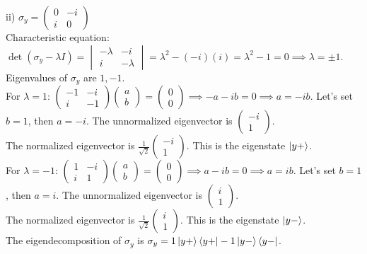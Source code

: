 \documentclass{article}
\newcommand{\0}{{$|0\rangle$}}
\newcommand{\1}{{$|1\rangle$}}
\begin{document}
ii) $\sigma_y = \begin{pmatrix} 0 & -i \\ i & 0 \end{pmatrix}$ \\
Characteristic equation: $\det(\sigma_y - \lambda I) = \begin{vmatrix} -\lambda & -i \\ i & -\lambda \end{vmatrix} = \lambda^2 - (-i)(i) = \lambda^2 - 1 = 0 \implies \lambda = \pm 1$. \\
Eigenvalues of $\sigma_y$ are $1, -1$. \\
For $\lambda = 1$: $\begin{pmatrix} -1 & -i \\ i & -1 \end{pmatrix} \begin{pmatrix} a \\ b \end{pmatrix} = \begin{pmatrix} 0 \\ 0 \end{pmatrix} \implies -a-ib=0 \implies a=-ib$. Let's set $b=1$, then $a=-i$. The unnormalized eigenvector is $\begin{pmatrix} -i \\ 1 \end{pmatrix}$. \\
The normalized eigenvector is $\frac{1}{\sqrt{2}}\begin{pmatrix} -i \\ 1 \end{pmatrix}$. This is the eigenstate $\ket{y+}$. \\
For $\lambda = -1$: $\begin{pmatrix} 1 & -i \\ i & 1 \end{pmatrix} \begin{pmatrix} a \\ b \end{pmatrix} = \begin{pmatrix} 0 \\ 0 \end{pmatrix} \implies a-ib=0 \implies a=ib$. Let's set $b=1$, then $a=i$. The unnormalized eigenvector is $\begin{pmatrix} i \\ 1 \end{pmatrix}$. \\
The normalized eigenvector is $\frac{1}{\sqrt{2}}\begin{pmatrix} i \\ 1 \end{pmatrix}$. This is the eigenstate $\ket{y-}$. \\
The eigendecomposition of $\sigma_y$ is $\sigma_y = 1\ket{y+}\bra{y+} - 1\ket{y-}\bra{y-}$.
\end{document}

